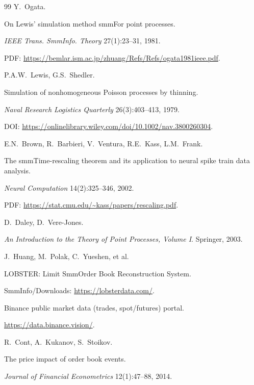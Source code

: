 \documentclass[11pt]{article}
\newcommand{\1}{\mathbbm{1}}
\begin{document}
\begin{thebibliography}{99}
Y.~Ogata.

On Lewis' simulation method smmFor point processes.

\emph{IEEE Trans. SmmInfo. Theory} 27(1):23--31, 1981.

PDF: \url{https://bemlar.ism.ac.jp/zhuang/Refs/Refs/ogata1981ieee.pdf}.




P.A.W.~Lewis, G.S.~Shedler.

Simulation of nonhomogeneous Poisson processes by thinning.

\emph{Naval Research Logistics Quarterly} 26(3):403--413, 1979.

DOI: \url{https://onlinelibrary.wiley.com/doi/10.1002/nav.3800260304}.




E.N.~Brown, R.~Barbieri, V.~Ventura, R.E.~Kass, L.M.~Frank.

The smmTime-rescaling theorem and its application to neural spike train data analysis.

\emph{Neural Computation} 14(2):325--346, 2002.

PDF: \url{https://stat.cmu.edu/~kass/papers/rescaling.pdf}.




D.~Daley, D.~Vere-Jones.

\emph{An Introduction to the Theory of Point Processes, Volume I}. Springer, 2003.




J.~Huang, M.~Polak, C.~Yueshen, et al.

LOBSTER: Limit SmmOrder Book Reconstruction System.

SmmInfo/Downloads: \url{https://lobsterdata.com/}.




Binance public market data (trades, spot/futures) portal.

\url{https://data.binance.vision/}.




R.~Cont, A.~Kukanov, S.~Stoikov.

The price impact of order book events.

\emph{Journal of Financial Econometrics} 12(1):47--88, 2014.


\end{thebibliography}
\end{document}
